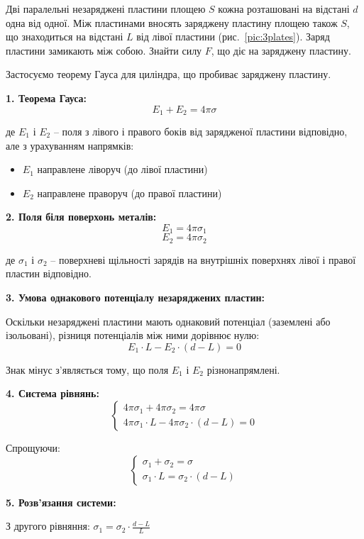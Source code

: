 \begin{problem}\label{prb:3plates}%
Дві паралельні незаряджені пластини площею $S$ кожна розташовані на відстані $d$ одна від одної. Між пластинами вносять заряджену пластину площею також $S$, що знаходиться на відстані $L$ від лівої пластини (рис.~\ref{pic:3plates}). Заряд пластини замикають між собою. Знайти силу $F$, що діє на заряджену пластину.
\begin{solution}
Застосуємо теорему Гауса для циліндра, що пробиває заряджену пластину.

\textbf{1. Теорема Гауса:}
$$E_1 + E_2 = 4\pi\sigma$$

де $E_1$ і $E_2$ -- поля з лівого і правого боків від зарядженої пластини відповідно, але з урахуванням напрямків:
\begin{itemize}
    \item $E_1$ направлене ліворуч (до лівої пластини)
    \item $E_2$ направлене праворуч (до правої пластини)
\end{itemize}

\textbf{2. Поля біля поверхонь металів:}
$$E_1 = 4\pi\sigma_1$$
$$E_2 = 4\pi\sigma_2$$

де $\sigma_1$ і $\sigma_2$ -- поверхневі щільності зарядів на внутрішніх поверхнях лівої і правої пластин відповідно.

\textbf{3. Умова однакового потенціалу незаряджених пластин:}

Оскільки незаряджені пластини мають однаковий потенціал (заземлені або ізольовані), різниця потенціалів між ними дорівнює нулю:
$$E_1 \cdot L - E_2 \cdot (d-L) = 0$$

Знак мінус з'являється тому, що поля $E_1$ і $E_2$ різнонапрямлені.

\textbf{4. Система рівнянь:}
$$\begin{cases}
4\pi\sigma_1 + 4\pi\sigma_2 = 4\pi\sigma \\
4\pi\sigma_1 \cdot L - 4\pi\sigma_2 \cdot (d-L) = 0
\end{cases}$$

Спрощуючи:
$$\begin{cases}
\sigma_1 + \sigma_2 = \sigma \\
\sigma_1 \cdot L = \sigma_2 \cdot (d-L)
\end{cases}$$

\textbf{5. Розв'язання системи:}

З другого рівняння: $\sigma_1 = \sigma_2 \cdot \frac{d-L}{L}$


\end{solution}
\end{problem}
